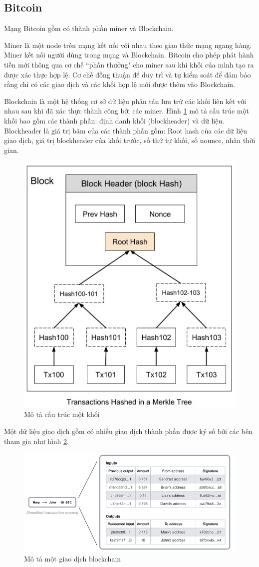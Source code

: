 \subsection{Bitcoin}
Mạng Bitcoin gồm có thành phần miner và Blockchain.

Miner là một node trên mạng kết nối với nhau theo giao thức mạng ngang hàng.
Miner kết nối người dùng trong mạng và Blockchain.
Bitcoin cho phép phát hành tiền mới thông qua cơ chế ``phần thưởng" cho miner sau khi khối của mình tạo ra được xác thực hợp lệ. 
Cơ chế đồng thuận để duy trì và tự kiểm soát để đảm bảo rằng chỉ có các giao dịch và các khối hợp lệ mới được thêm vào Blockchain.

Blockchain là một hệ thống cơ sở dữ liệu phân tán lưu trữ các khối liên kết với nhau sau khi đã xác thực thành công bởi các miner. Hình \ref{fig:merkle_bitcoin} mô tả cấu trúc một khối bao gồm các thành phần: định danh khối (blockheader) và dữ liệu.
Blockheader là giá trị băm của các thành phần gồm: Root hash của các dữ liệu giao dịch, giá trị blockheader của khối trước, số thứ tự khối, số nounce, nhãn thời gian.

\begin{figure}[htbp]
\centering
\includegraphics[width=.5\linewidth]{img/merkle_tree.jpg}
\caption{Mô tả cấu trúc một khối}
\label{fig:merkle_bitcoin}
\end{figure}

Một dữ liệu giao dịch gồm có nhiều giao dịch thành phần được ký số bởi các bên tham gia như hình \ref{fig:trans_bitcoin}.

\begin{figure}[htbp]
\centering
\includegraphics[width=.9\linewidth]{img/trans_bitcoin.png}
\caption{Mô tả một giao dịch blockchain}
\label{fig:trans_bitcoin}
\end{figure}


